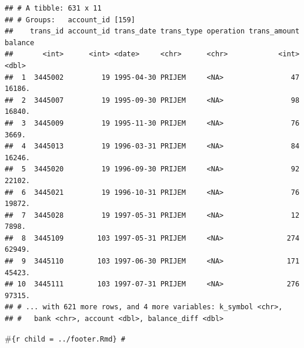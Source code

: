 \documentclass[]{article}
\begin{document}
\begin{verbatim}
## # A tibble: 631 x 11
## # Groups:   account_id [159]
##    trans_id account_id trans_date trans_type operation trans_amount balance
##       <int>      <int> <date>     <chr>      <chr>            <int>   <dbl>
##  1  3445002         19 1995-04-30 PRIJEM     <NA>                47  16186.
##  2  3445007         19 1995-09-30 PRIJEM     <NA>                98  16840.
##  3  3445009         19 1995-11-30 PRIJEM     <NA>                76   3669.
##  4  3445013         19 1996-03-31 PRIJEM     <NA>                84  16246.
##  5  3445020         19 1996-09-30 PRIJEM     <NA>                92  22102.
##  6  3445021         19 1996-10-31 PRIJEM     <NA>                76  19872.
##  7  3445028         19 1997-05-31 PRIJEM     <NA>                12   7898.
##  8  3445109        103 1997-05-31 PRIJEM     <NA>               274  62949.
##  9  3445110        103 1997-06-30 PRIJEM     <NA>               171  45423.
## 10  3445111        103 1997-07-31 PRIJEM     <NA>               276  97315.
## # ... with 621 more rows, and 4 more variables: k_symbol <chr>,
## #   bank <chr>, account <dbl>, balance_diff <dbl>
\end{verbatim}

\#\texttt{\{r\ child\ =\ \textquotesingle{}../footer.Rmd\textquotesingle{}\}\ \#}
\end{document}
